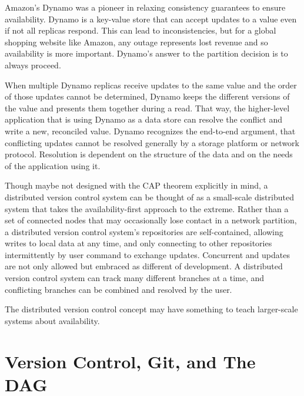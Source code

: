 Amazon's Dynamo\cite{dynamo} was a pioneer in relaxing consistency guarantees to
ensure availability. Dynamo is a key-value store that can accept updates to a
value even if not all replicas respond. This can lead to inconsistencies, but
for a global shopping website like Amazon, any outage represents lost revenue
and so availability is more important. Dynamo's answer to the partition decision
is to always proceed.

When multiple Dynamo replicas receive updates to the same value and the order of
those updates cannot be determined, Dynamo keeps the different versions of the
value and presents them together during a read. That way, the higher-level
application that is using Dynamo as a data store can resolve the conflict and
write a new, reconciled value. Dynamo recognizes the end-to-end
argument\cite{endtoendargument}, that conflicting updates cannot be resolved
generally by a storage platform or network protocol. Resolution is dependent on
the structure of the data and on the needs of the application using it.

Though maybe not designed with the CAP theorem explicitly in mind, a distributed
version control system can be thought of as a small-scale distributed system
that takes the availability-first approach to the extreme. Rather than a set of
connected nodes that may occasionally lose contact in a network partition, a
distributed version control system's repositories are self-contained, allowing
writes to local data at any time, and only connecting to other repositories
intermittently by user command to exchange updates. Concurrent and updates are
not only allowed but embraced as different  of development. A
distributed version control system can track many different branches at a time,
and conflicting branches can be combined and resolved by the user.

The distributed version control concept may have something to teach larger-scale
systems about availability.

%



\section{Version Control, Git, and The DAG}



